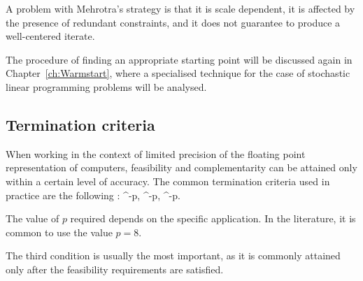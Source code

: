 A problem with Mehrotra's strategy is that it is scale dependent,
it is affected by the presence of redundant constraints,
and it does not guarantee to produce a well-centered iterate.

The procedure of finding an appropriate starting point will be discussed
again in Chapter~\ref{ch:Warmstart}, where a specialised technique for
the case of stochastic linear programming problems will be analysed.

%
%
\subsection{Termination criteria}

When working in the context of limited precision of the
floating point representation of computers, feasibility and
complementarity can be attained only within a certain level
of accuracy.
The common termination criteria used in practice are the
following \cite{GondzioTerlaky}:
\be  \label{eq:TerminationCriteria}
  ^{-p}, 
\qquad
{}  ^{-p},
\qquad
{}  ^{-p}.
\ee

The value of $p$ required depends on the specific application.
In the literature, it is common to use the value $p = 8$.

The third condition is usually the most important, as it is
commonly attained only after the feasibility requirements are satisfied.

